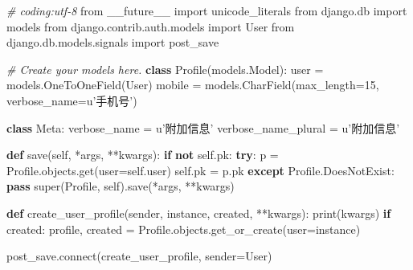 \documentclass[]{article}
\newenvironment{Shaded}{}{}
\newcommand{\KeywordTok}[1]{\textcolor[rgb]{0.00,0.44,0.13}{\textbf{#1}}}
\newcommand{\DecValTok}[1]{\textcolor[rgb]{0.25,0.63,0.44}{#1}}
\newcommand{\StringTok}[1]{\textcolor[rgb]{0.25,0.44,0.63}{#1}}
\newcommand{\ImportTok}[1]{#1}
\newcommand{\CommentTok}[1]{\textcolor[rgb]{0.38,0.63,0.69}{\textit{#1}}}
\newcommand{\VariableTok}[1]{\textcolor[rgb]{0.10,0.09,0.49}{#1}}
\newcommand{\ControlFlowTok}[1]{\textcolor[rgb]{0.00,0.44,0.13}{\textbf{#1}}}
\newcommand{\OperatorTok}[1]{\textcolor[rgb]{0.40,0.40,0.40}{#1}}
\newcommand{\BuiltInTok}[1]{#1}
\newcommand{\ExtensionTok}[1]{#1}
\newcommand{\NormalTok}[1]{#1}
\begin{document}
\begin{Shaded}
\begin{Highlighting}[]
\CommentTok{# coding:utf-8}
\ImportTok{from}\NormalTok{ __future__ }\ImportTok{import}\NormalTok{ unicode_literals}
\ImportTok{from}\NormalTok{ django.db }\ImportTok{import}\NormalTok{ models}
\ImportTok{from}\NormalTok{ django.contrib.auth.models }\ImportTok{import}\NormalTok{ User}
\ImportTok{from}\NormalTok{ django.db.models.signals }\ImportTok{import}\NormalTok{ post_save}


\CommentTok{# Create your models here.}
\KeywordTok{class}\NormalTok{ Profile(models.Model):}
\NormalTok{    user }\OperatorTok{=}\NormalTok{ models.OneToOneField(User)}
\NormalTok{    mobile }\OperatorTok{=}\NormalTok{ models.CharField(max_length}\OperatorTok{=}\DecValTok{15}\NormalTok{, verbose_name}\OperatorTok{=}\StringTok{u'手机号'}\NormalTok{)}

    \KeywordTok{class}\NormalTok{ Meta:}
\NormalTok{        verbose_name }\OperatorTok{=} \StringTok{u'附加信息'}
\NormalTok{        verbose_name_plural }\OperatorTok{=} \StringTok{u'附加信息'}

    \KeywordTok{def}\NormalTok{ save(}\VariableTok{self}\NormalTok{, }\OperatorTok{*}\NormalTok{args, }\OperatorTok{**}\NormalTok{kwargs):}
        \ControlFlowTok{if} \KeywordTok{not} \VariableTok{self}\NormalTok{.pk:}
            \ControlFlowTok{try}\NormalTok{:}
\NormalTok{                p }\OperatorTok{=}\NormalTok{ Profile.objects.get(user}\OperatorTok{=}\VariableTok{self}\NormalTok{.user)}
                \VariableTok{self}\NormalTok{.pk }\OperatorTok{=}\NormalTok{ p.pk}
            \ControlFlowTok{except}\NormalTok{ Profile.DoesNotExist:}
                \ControlFlowTok{pass}
        \BuiltInTok{super}\NormalTok{(Profile, }\VariableTok{self}\NormalTok{).save(}\OperatorTok{*}\NormalTok{args, }\OperatorTok{**}\NormalTok{kwargs)}


\KeywordTok{def}\NormalTok{ create_user_profile(sender, instance, created, }\OperatorTok{**}\NormalTok{kwargs):}
    \BuiltInTok{print}\NormalTok{(kwargs)}
    \ControlFlowTok{if}\NormalTok{ created:}
\NormalTok{        profile, created }\OperatorTok{=}\NormalTok{ Profile.objects.get_or_create(user}\OperatorTok{=}\NormalTok{instance)}


\NormalTok{post_save.}\ExtensionTok{connect}\NormalTok{(create_user_profile, sender}\OperatorTok{=}\NormalTok{User)}
\end{Highlighting}
\end{Shaded}
\end{document}
